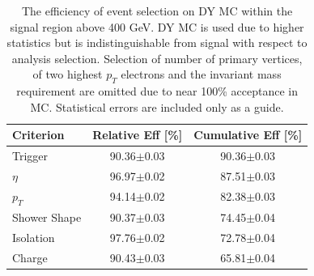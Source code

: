    \begin {table}[h]
      \begin{center}
      \begin{tabular}{|l|c|c|}
         \hline
         \hline
         Criterion & Relative Eff [\%] & Cumulative Eff [\%] \\
         \hline
         Trigger & 90.36$\pm$0.03 & 90.36$\pm$0.03 \\
         $\eta$ & 96.97$\pm$0.02 & 87.51$\pm$0.03 \\
         $p_{T}$ & 94.14$\pm$0.02 & 82.38$\pm$0.03 \\
         Shower Shape & 90.37$\pm$0.03 & 74.45$\pm$0.04 \\
         Isolation & 97.76$\pm$0.02 & 72.78$\pm$0.04 \\
         Charge & 90.43$\pm$0.03 & 65.81$\pm$0.04 \\
         \hline
         \hline
      \end{tabular}
      \caption{The efficiency of event selection on DY MC within the signal region above 400 GeV. DY MC is used due to higher statistics but is indistinguishable from signal with respect to analysis selection. Selection of number of primary vertices, of two highest $p_{T}$ electrons and the invariant mass requirement are omitted due to near 100\% acceptance in MC. Statistical errors are included only as a guide.}
      \label{tab:eventEff}
      \end{center}
   \end {table}




